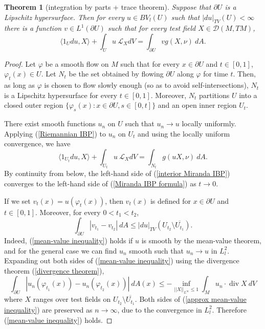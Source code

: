 \documentclass[reqno,12pt,letterpaper]{amsart}
\DeclareMathOperator{\Div}{div}
\newtheorem{theorem}{Theorem}[section]
\theoremstyle{definition}
\numberwithin{equation}{section}
\begin{document}
\begin{theorem}[integration by parts + trace theorem]\label{Miranda IBP}
Suppose that $\partial U$ is a Lipschitz hypersurface.
Then for every $u \in BV_l(U)$ such that $|du|_{TV}(U) < \infty$ there is a function $v \in L^1(\partial U)$ such that for every test field $X \in \mathcal D(M, TM)$,
\begin{equation}
\label{Miranda IBP formula}
\langle 1_Udu, X\rangle + \int_U u ~\mathcal L_XdV = \int_{\partial U} vg(X, \nu) ~dA.
\end{equation}
\end{theorem}
\begin{proof}
Let $\varphi$ be a smooth flow on $M$ such that for every $x \in \partial U$ and $t \in [0, 1]$, $\varphi_t(x) \in U$.
Let $N_t$ be the set obtained by flowing $\partial U$ along $\varphi$ for time $t$.
Then, as long as $\varphi$ is chosen to flow slowly enough (so as to avoid self-intersections), $N_t$ is a Lipschitz hypersurface for every $t \in [0, 1]$.
Moreover, $N_t$ partitions $U$ into a closed outer region $\{\varphi_s(x): x \in \partial U, s \in [0, t]\}$ and an open inner region $U_t$.

There exist smooth functions $u_n$ on $U$ such that $u_n \to u$ locally uniformly.
Applying (\ref{Riemannian IBP}) to $u_n$ on $U_t$ and using the locally uniform convergence, we have
\begin{equation}
\label{interior Miranda IBP}
\langle 1_{U_t}du, X\rangle + \int_{U_t} u ~\mathcal L_XdV = \int_{N_t} g(uX, \nu) ~dA.
\end{equation}
By continuity from below, the left-hand side of (\ref{interior Miranda IBP}) converges to the left-hand side of (\ref{Miranda IBP formula}) as $t \to 0$.

If we set $v_t(x) = u(\varphi_t(x))$, then $v_t(x)$ is defined for $x \in \partial U$ and $t \in [0, 1]$.
Moreover, for every $0 < t_1 < t_2$,
\begin{equation}
\label{mean-value inequality}
\int_{\partial U} |v_{t_1} - v_{t_2}| ~dA \leq |du|_{TV}(U_{t_2} \setminus \overline{U_{t_1}}).
\end{equation}
Indeed, (\ref{mean-value inequality}) holds if $u$ is smooth by the mean-value theorem, and for the general case we can find $u_n$ smooth such that $u_n \to u$ in $L^2_l$.
Expanding out both sides of (\ref{mean-value inequality}) using the divergence theorem (\ref{divergence theorem}),
\begin{equation}
\label{approx mean-value inequality}
\int_{\partial U} |u_n(\varphi_{t_1}(x)) - u_n(\varphi_{t_2}(x))| ~dA(x) \leq -\inf_{||X||_{L^\infty} \leq 1} \int_M u_n\cdot \Div X~dV
\end{equation}
where $X$ ranges over test fields on $U_{t_2} \setminus \overline{U_{t_1}}$.
Both sides of (\ref{approx mean-value inequality}) are preserved as $n \to \infty$, due to the convergence in $L^2_l$.
Therefore (\ref{mean-value inequality}) holds.


\end{proof}
\end{document}
